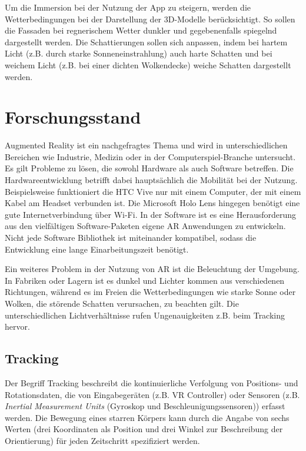 Um die Immersion bei der Nutzung der App zu steigern, werden die Wetterbedingungen bei der Darstellung der 3D-Modelle berücksichtigt. So sollen die Fassaden bei regnerischem Wetter dunkler und gegebenenfalls spiegelnd dargestellt werden. Die Schattierungen sollen sich anpassen, indem bei hartem Licht (z.B. durch starke Sonneneinstrahlung) auch harte Schatten und bei weichem Licht (z.B. bei einer dichten Wolkendecke) weiche Schatten dargestellt werden.

\section{Forschungsstand}
Augmented Reality ist ein nachgefragtes Thema und wird in unterschiedlichen Bereichen wie Industrie, Medizin oder in der Computerspiel-Branche untersucht\cite{Sudirman}\cite{Santi}\cite{Huang}. Es gilt Probleme zu lösen, die sowohl Hardware als auch Software betreffen. Die Hardwareentwicklung betrifft dabei hauptsächlich die Mobilität bei der Nutzung. Beispielsweise funktioniert die HTC Vive nur mit einem Computer, der mit einem Kabel am Headset verbunden ist. Die Microsoft Holo Lens hingegen benötigt eine gute Internetverbindung über Wi-Fi. In der Software ist es eine Herausforderung aus den vielfältigen Software-Paketen eigene AR Anwendungen zu entwickeln. Nicht jede Software Bibliothek ist miteinander kompatibel, sodass die Entwicklung eine lange Einarbeitungszeit benötigt\cite*[Vgl.][]{Santi}.

Ein weiteres Problem in der Nutzung von AR ist die Beleuchtung der Umgebung. In Fabriken oder Lagern ist es dunkel und Lichter kommen aus verschiedenen Richtungen, während es im Freien die Wetterbedingungen wie starke Sonne oder Wolken, die störende Schatten verursachen, zu beachten gilt. Die unterschiedlichen Lichtverhältnisse rufen Ungenauigkeiten z.B. beim Tracking hervor.

\subsection{Tracking}
Der Begriff Tracking beschreibt die kontinuierliche Verfolgung von Positions- und Rotationsdaten, die von Eingabegeräten (z.B. VR Controller) oder Sensoren (z.B. \textit{Inertial Measurement Units} (Gyroskop und Beschleunigungssensoren)) erfasst werden. Die Bewegung eines starren Körpers kann \glqq durch die Angabe von sechs Werten (drei Koordinaten als Position und drei Winkel zur Beschreibung der Orientierung) für jeden Zeitschritt spezifiziert werden\grqq{}\cite*[Dörner (2019) S.119f.]{doerner}. 

